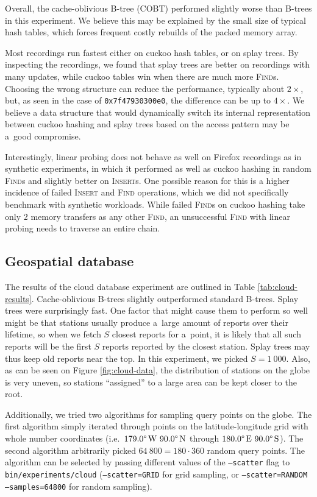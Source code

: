 Overall, the cache-oblivious B-tree (COBT) performed slightly worse than
\mbox{B-trees} in this experiment. We believe this may be explained by the
small size of typical hash tables, which forces frequent costly rebuilds of
the packed memory array.

Most recordings run fastest either on cuckoo hash tables, or on splay trees.
By inspecting the recordings, we found that splay trees are better on recordings
with many updates, while cuckoo tables win when there are much more
\textsc{Find}s. Choosing the wrong structure can reduce the performance,
typically about $2\times$, but, as seen in the case of \texttt{0x7f47930300e0},
the difference can be up to $4\times$.
We believe a data structure that would dynamically switch
its internal representation between cuckoo hashing and splay trees
based on the access pattern may be a~good compromise.

Interestingly, linear probing does not behave as well on Firefox recordings
as in synthetic experiments, in which it performed as well as cuckoo hashing
in random \textsc{Find}s and slightly better on \textsc{Insert}s. One possible
reason for this is a higher incidence of failed \textsc{Insert} and
\textsc{Find} operations, which we did not specifically benchmark with
synthetic workloads. While failed \textsc{Find}s on cuckoo hashing take only
2 memory transfers as any other \textsc{Find}, an unsuccessful \textsc{Find}
with linear probing needs to traverse an entire chain.

\subsection{Geospatial database}
The results of the cloud database experiment are outlined in Table
\ref{tab:cloud-results}. Cache-oblivious \mbox{B-trees} slightly outperformed
standard \mbox{B-trees}. Splay trees were surprisingly fast. One factor that
might cause them to perform so well might be that stations usually produce
a~large amount of reports over their lifetime, so when we fetch $S$ closest
reports for a~point, it is likely that all such reports will be the first $S$
reports reported by the closest station. Splay trees may thus keep old reports
near the top. In this experiment, we picked $S=1~000$. Also, as can be
seen on Figure \ref{fig:cloud-data}, the distribution of stations on the globe
is very uneven, so stations ``assigned'' to a large area can be kept closer to
the root.

Additionally, we tried two algorithms for sampling query points on the globe.
The first algorithm simply iterated through points on the latitude-longitude
grid with whole number coordinates (i.e.\
$179.0\degree\,\text{W}\ 90.0\degree\,\text{N}$ through
$180.0\degree\,\text{E}\ 90.0\degree\,\text{S}$).
The second algorithm arbitrarily picked $64~800=180\cdot 360$ random query
points.
The algorithm can be selected by passing different values of the
\texttt{--scatter} flag to \texttt{bin/experiments/cloud}
(\texttt{--scatter=GRID} for grid sampling, or \texttt{--scatter=RANDOM
--samples=64800} for random sampling).

